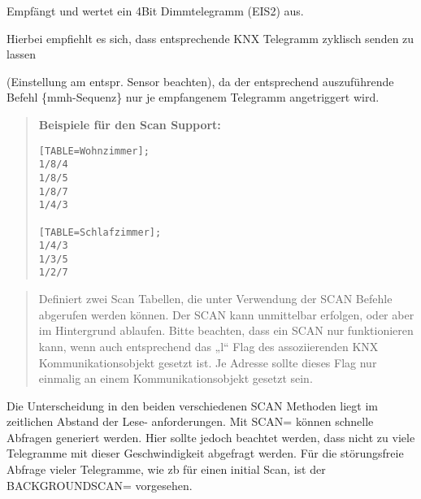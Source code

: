 \documentclass[letterpaper,10pt,english]{sphinxmanual}
\begin{document}
\begin{DUlineblock}{0em}
\item[] Empfängt und wertet ein 4Bit Dimmtelegramm (EIS2) aus.
\item[] Hierbei empfiehlt es sich, dass entsprechende KNX Telegramm zyklisch senden zu lassen
\item[] (Einstellung am entspr. Sensor beachten), da der entsprechend auszuführende Befehl \{mmh-Sequenz\} nur je empfangenem  Telegramm angetriggert wird.
\end{DUlineblock}

\begin{DUlineblock}{0em}
\item[] 
\end{DUlineblock}
\begin{quote}

\textbf{Beispiele für den Scan Support:}

\begin{Verbatim}[commandchars=\\\{\}]
[TABLE=Wohnzimmer];
1/8/4
1/8/5
1/8/7
1/4/3

[TABLE=Schlafzimmer];
1/4/3
1/3/5
1/2/7
\end{Verbatim}
\end{quote}

\begin{DUlineblock}{0em}
\item[] 
\end{DUlineblock}
\begin{quote}

Definiert zwei Scan Tabellen, die unter Verwendung der SCAN Befehle abgerufen werden können. Der SCAN kann unmittelbar erfolgen, oder aber im Hintergrund ablaufen. Bitte beachten, dass ein SCAN nur funktionieren kann, wenn auch entsprechend das „l“ Flag des assoziierenden KNX Kommunikationsobjekt gesetzt ist. Je Adresse sollte dieses Flag nur einmalig an einem Kommunikationsobjekt gesetzt sein.
\end{quote}

\begin{DUlineblock}{0em}
\item[] 
\end{DUlineblock}

Die Unterscheidung in den beiden verschiedenen SCAN Methoden liegt im zeitlichen Abstand der Lese- anforderungen. Mit SCAN= können schnelle Abfragen generiert werden. Hier sollte jedoch beachtet werden, dass nicht zu viele Telegramme mit dieser Geschwindigkeit abgefragt werden. Für die störungsfreie Abfrage vieler Telegramme, wie zb für einen initial Scan, ist der BACKGROUNDSCAN= vorgesehen.
\end{document}
